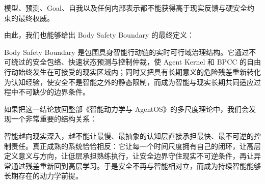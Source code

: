 \begin{statementbox}
\centering
{}
\end{statementbox}

模型、预测、Goal、自我以及任何内部表示都不能获得高于现实反馈与硬安全约束的最终权威。

由此，我们也能够给出 Body Safety Boundary 的最终定义：

\begin{definition*}
Body Safety Boundary 是包围具身智能行动链的实时可行域治理结构。它通过不可绕过的安全包络、快速状态预测与控制仲裁，使 Agent Kernel 和 BPCC 的自由行动始终发生在可接受的现实区域内；同时又把具有长期意义的危险残差重新转化为认知经验，使安全不是智能之外的静态限制，而成为智能与现实长期共同适应过程中不可缺少的边界条件。
\end{definition*}

如果把这一结论放回整部《智能动力学与 AgentOS》的多尺度理论中，我们会发现一个非常重要的结构关系：
\begin{statementbox}
\centering
{}
\end{statementbox}
智能越向现实深入，越不能让最慢、最抽象的认知层直接承担最快、最不可逆的控制责任。真正成熟的系统恰恰相反：它让每一个时间尺度拥有自己的闭环，让高层定义意义与方向，让低层承担熟练执行，让安全边界守住现实不可逆条件，再让异常通过残差重新回到高层学习。于是安全不再与智能相对立，而成为持续智能能够长期存在的动力学前提。
